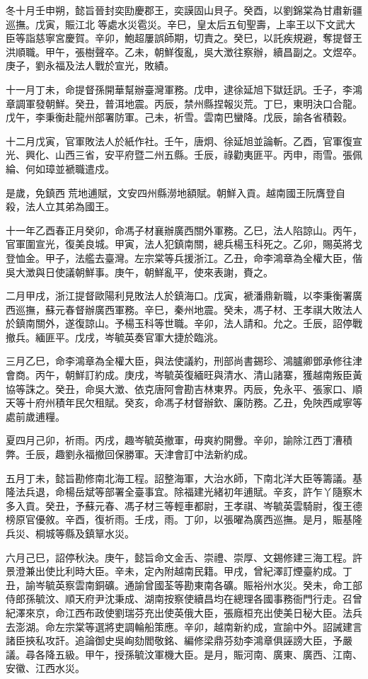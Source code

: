 \begin{pinyinscope}
冬十月壬申朔，懿旨晉封奕劻慶郡王，奕謨固山貝子。癸酉，以劉錦棠為甘肅新疆巡撫。戊寅，賑江北等處水災雹災。辛巳，皇太后五旬聖壽，上率王以下文武大臣等詣慈寧宮慶賀。辛卯，鮑超屢誤師期，切責之。癸巳，以託疾規避，奪提督王洪順職。甲午，張樹聲卒。乙未，朝鮮復亂，吳大澂往察辦，續昌副之。文煜卒。庚子，劉永福及法人戰於宣光，敗績。

十一月丁未，命提督孫開華幫辦臺灣軍務。戊申，逮徐延旭下獄廷訊。壬子，李鴻章調軍發朝鮮。癸丑，普洱地震。丙辰，禁州縣捏報災荒。丁巳，東明決口合龍。戊午，李秉衡赴龍州部署防軍。己未，祈雪。雲南巴蠻降。戊辰，諭各省積穀。

十二月戊寅，官軍敗法人於紙作社。壬午，唐炯、徐延旭並論斬。乙酉，官軍復宣光、興化、山西三省，安平府暨二州五縣。壬辰，祿勸夷匪平。丙申，雨雪。張佩綸、何如璋並褫職遣戍。

是歲，免鎮西荒地逋賦，文安四州縣澇地額賦。朝鮮入貢。越南國王阮膺登自殺，法人立其弟為國王。

十一年乙酉春正月癸卯，命馮子材襄辦廣西關外軍務。乙巳，法人陷諒山。丙午，官軍圍宣光，復美良城。甲寅，法人犯鎮南關，總兵楊玉科死之。乙卯，賜英將戈登恤金。甲子，法艦去臺灣。左宗棠等兵援浙江。乙丑，命李鴻章為全權大臣，偕吳大澂與日使議朝鮮事。庚午，朝鮮亂平，使來表謝，賚之。

二月甲戌，浙江提督歐陽利見敗法人於鎮海口。戊寅，褫潘鼎新職，以李秉衡署廣西巡撫，蘇元春督辦廣西軍務。辛巳，秦州地震。癸未，馮子材、王孝祺大敗法人於鎮南關外，遂復諒山。予楊玉科等世職。辛卯，法人請和。允之。壬辰，詔停戰撤兵。緬匪平。戊戌，岑毓英奏官軍大捷於臨洮。

三月乙巳，命李鴻章為全權大臣，與法使議約，刑部尚書錫珍、鴻臚卿鄧承修往津會商。丙午，朝鮮訂約成。庚戌，岑毓英復緬旺與清水、清山諸寨，獲越南叛臣黃協等誅之。癸丑，命吳大澂、依克唐阿會勘吉林東界。丙辰，免永平、張家口、順天等十府州積年民欠租賦。癸亥，命馮子材督辦欽、廉防務。乙丑，免陜西咸寧等處前歲逋糧。

夏四月己卯，祈雨。丙戌，趣岑毓英撤軍，毋爽約開釁。辛卯，諭除江西丁漕積弊。壬辰，趣劉永福撤回保勝軍。天津會訂中法新約成。

五月丁未，懿旨勘修南北海工程。詔整海軍，大治水師，下南北洋大臣等籌議。基隆法兵退，命楊岳斌等部署全臺事宜。除福建光緒初年逋賦。辛亥，許乍丫隨察木多入貢。癸丑，予蘇元春、馮子材三等輕車都尉，王孝祺、岑毓英雲騎尉，復王德榜原官優敘。辛酉，復祈雨。壬戌，雨。丁卯，以張曜為廣西巡撫。是月，賑基隆兵災、桐城等縣及鎮筸水災。

六月己巳，詔停秋決。庚午，懿旨命文金舌、崇禮、崇厚、文錫修建三海工程。許景澄兼出使比利時大臣。辛未，定內附越南民籍。甲戌，曾紀澤訂煙臺約成。丁丑，諭岑毓英察雲南銅礦。通諭曾國荃等勘東南各礦。賑裕州水災。癸未，命工部侍郎孫毓汶、順天府尹沈秉成、湖南按察使續昌均在總理各國事務衙門行走。召曾紀澤來京，命江西布政使劉瑞芬充出使英俄大臣，張廕桓充出使美日秘大臣。法兵去澎湖。命左宗棠等選將吏調輪船策應。辛卯，越南新約成，宣諭中外。詔誡建言諸臣挾私攻訐。追論御史吳峋劾閻敬銘、編修梁鼎芬劾李鴻章俱誣謗大臣，予嚴議。尋各降五級。甲午，授孫毓汶軍機大臣。是月，賑河南、廣東、廣西、江南、安徽、江西水災。


\end{pinyinscope}
